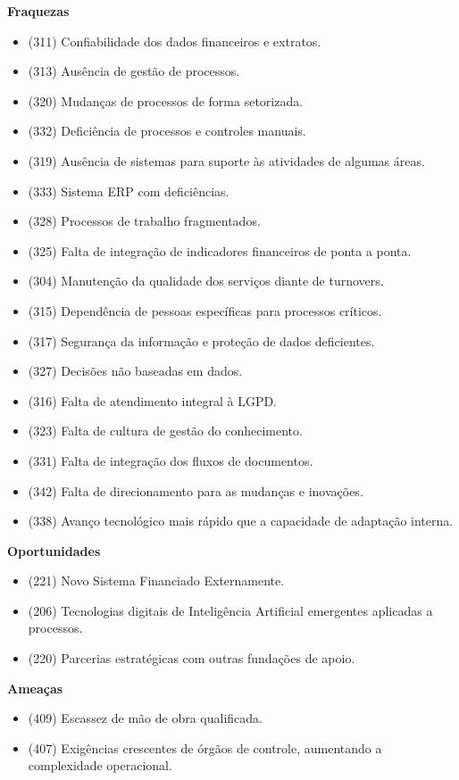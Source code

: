 \documentclass[12pt,a4paper]{article}
\begin{document}
\textbf{Fraquezas}
\begin{itemize}[leftmargin=1.25cm,topsep=0pt,itemsep=2pt,parsep=0pt]
  \item (311) Confiabilidade dos dados financeiros e extratos.
  \item (313) Ausência de gestão de processos.
  \item (320) Mudanças de processos de forma setorizada.
  \item (332) Deficiência de processos e controles manuais.
  \item (319) Ausência de sistemas para suporte às atividades de algumas áreas.
  \item (333) Sistema ERP com deficiências.
  \item (328) Processos de trabalho fragmentados.
  \item (325) Falta de integração de indicadores financeiros de ponta a ponta.
  \item (304) Manutenção da qualidade dos serviços diante de turnovers.
  \item (315) Dependência de pessoas específicas para processos críticos.
  \item (317) Segurança da informação e proteção de dados deficientes.
  \item (327) Decisões não baseadas em dados.
  \item (316) Falta de atendimento integral à LGPD.
  \item (323) Falta de cultura de gestão do conhecimento.
  \item (331) Falta de integração dos fluxos de documentos.
  \item (342) Falta de direcionamento para as mudanças e inovações.
  \item (338) Avanço tecnológico mais rápido que a capacidade de adaptação interna.
\end{itemize}

\textbf{Oportunidades}
\begin{itemize}[leftmargin=1.25cm,topsep=0pt,itemsep=2pt,parsep=0pt]
  \item (221) Novo Sistema Financiado Externamente.
  \item (206) Tecnologias digitais de Inteligência Artificial emergentes aplicadas a processos.
  \item (220) Parcerias estratégicas com outras fundações de apoio.
\end{itemize}

\textbf{Ameaças}
\begin{itemize}[leftmargin=1.25cm,topsep=0pt,itemsep=2pt,parsep=0pt]
  \item (409) Escassez de mão de obra qualificada.
  \item (407) Exigências crescentes de órgãos de controle, aumentando a complexidade operacional.
\end{itemize}
\end{document}
